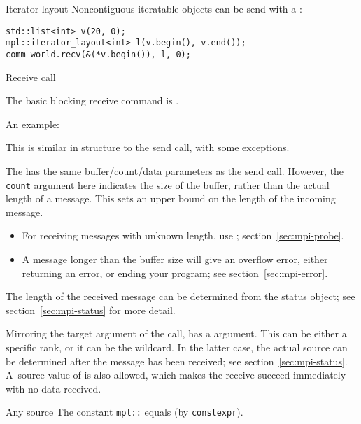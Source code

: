 \begin{mplnote}{Iterator layout}
  Noncontiguous iteratable objects can be send with a
  :
\begin{lstlisting}
std::list<int> v(20, 0);
mpl::iterator_layout<int> l(v.begin(), v.end());
comm_world.recv(&(*v.begin()), l, 0);  
\end{lstlisting}
\end{mplnote}

 {Receive call}

The basic blocking receive command is
.

An example:
%

This is similar in structure to the send call, with some exceptions.

The  has the same buffer/count/data parameters as the send
call.
However, 
the \lstinline{count} argument here indicates the size of the buffer,
rather than the actual length of a message.
This sets an upper bound on the length of the incoming message.
\begin{itemize}
\item For receiving messages with unknown length, use ;
  section~\ref{sec:mpi-probe}.
\item A message longer than the buffer size will give an overflow error,
  either returning an error, or ending your program; see section~\ref{sec:mpi-error}.
\end{itemize}
The length of the received message can be determined 
from the status object; see section~\ref{sec:mpi-status} for more detail.

Mirroring the target argument of the  call,
 has a 
argument.
This can be either a specific rank, or it can be the
 wildcard. In the latter case, the actual
source can be determined after the message has been received;
see section~\ref{sec:mpi-status}.
A~source value of  is also allowed,
which makes the receive succeed immediately with no data received.

\begin{mplnote}{Any source}
  The constant \lstinline+mpl::+
  equals  (by \lstinline+constexpr+).
\end{mplnote}

